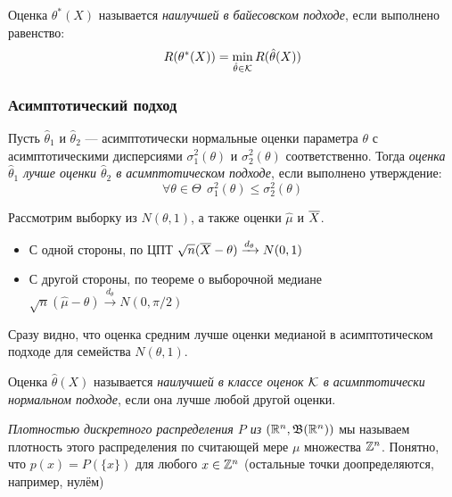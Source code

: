 \begin{definition}
	Оценка $\theta^*(X)$ называется \textit{наилучшей в байесовском подходе}, если выполнено равенство:
	\[
		R(\theta^*(X)) = \min_{\hat{\theta} \in \mathcal{K}} R(\hat{\theta}(X))
	\]
\end{definition}

\subsubsection{Асимптотический подход}

\begin{definition}
	Пусть $\hat{\theta}_1$ и $\hat{\theta}_2$ --- асимптотически нормальные оценки параметра $\theta$ с асимптотическими дисперсиями $\sigma_1^2(\theta)$ и $\sigma_2^2(\theta)$ соответственно. Тогда \textit{оценка $\hat{\theta}_1$ лучше оценки $\hat{\theta}_2$ в асимптотическом подходе}, если выполнено утверждение:
	\[
		\forall \theta \in \Theta\ \ \sigma_1^2(\theta) \le \sigma_2^2(\theta)
	\]
\end{definition}

\begin{example}
	Рассмотрим выборку из $N(\theta, 1)$, а также оценки $\hat{\mu}$ и $\overline{X}$.
	\begin{itemize}
		\item С одной стороны, по ЦПТ $\sqrt{n}(\overline{X} - \theta) \xrightarrow{d_\theta} N(0, 1)$
		
		\item С другой стороны, по теореме о выборочной медиане $\sqrt{n}(\hat{\mu} - \theta) \xrightarrow{d_{\theta}} N(0, \pi / 2)$
	\end{itemize}
	Сразу видно, что оценка средним лучше оценки медианой в асимптотическом подходе для семейства $N(\theta, 1)$.
\end{example}

\begin{definition}
	Оценка $\hat{\theta}(X)$ называется \textit{наилучшей в классе оценок $\mathcal{K}$ в асимптотически нормальном подходе}, если она лучше любой другой оценки.
\end{definition}

\begin{note}
	\textit{Плотностью дискретного распределения $P$ из $(\mathbb{R}^n, \mathfrak{B}(\mathbb{R}^n))$} мы называем плотность этого распределения по считающей мере $\mu$ множества $\mathbb{Z}^n$. Понятно, что $p(x) = P(\{x\})$ для любого $x \in \mathbb{Z}^n$ (остальные точки доопределяются, например, нулём)
\end{note}

